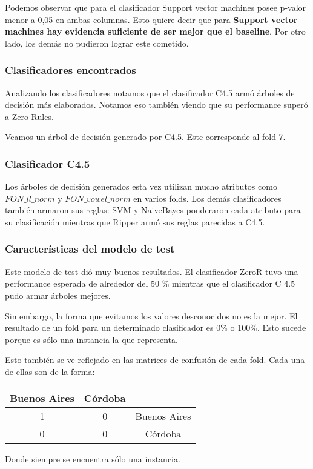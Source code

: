 Podemos observar que para el clasificador Support vector machines posee p-valor menor a 0,05 en ambas columnas. Esto quiere decir que para \textbf{Support vector machines hay evidencia suficiente de ser mejor que el baseline}. Por otro lado, los demás no pudieron lograr este cometido. 

\subsubsection{Clasificadores encontrados}

Analizando los clasificadores notamos que el clasificador C4.5 armó árboles de decisión más elaborados. Notamos eso también viendo que su performance superó a Zero Rules. 

Veamos un árbol de decisión generado por C4.5. Este corresponde al fold 7. 

\subsubsection*{Clasificador C4.5}

Los árboles de decisión generados esta vez utilizan mucho  atributos como $FON\_ll\_norm$ y $FON\_vowel\_norm$ en varios folds. Los demás clasificadores también armaron sus reglas: SVM y NaiveBayes ponderaron cada atributo para su clasificación mientras que Ripper armó sus reglas parecidas a C4.5. 

\subsubsection{Características del modelo de test}

Este modelo de test dió muy buenos resultados. El clasificador ZeroR tuvo una performance esperada de alrededor del 50 \% mientras que el clasificador C 4.5 pudo armar árboles mejores. 

Sin embargo, la forma que evitamos los valores desconocidos no es la mejor. El resultado de un fold para un determinado clasificador es 0\% o 100\%. Esto sucede porque es sólo una instancia la que representa. 

Esto también se ve reflejado en las matrices de confusión de cada fold. Cada una de ellas son de la forma: 

\begin{table}[H]
	\centering
	\begin{tabular}{|c|c|c|}
		\hline
		Buenos Aires & Córdoba & \\ \hline
		1 & 0 & Buenos Aires\\ \hline
		0 & 0 & Córdoba\\ \hline
	\end{tabular}
\end{table}

Donde siempre se encuentra sólo una instancia.

